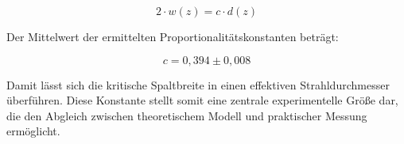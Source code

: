 \begin{equation}
    2 \cdot w(z) = c \cdot d(z)
    \label{suchung_c}
\end{equation}

Der Mittelwert der ermittelten Proportionalitätskonstanten beträgt:

\begin{equation*}
    c = 0{,}394 \pm 0{,}008
\end{equation*}

Damit lässt sich die kritische Spaltbreite in einen effektiven Strahldurchmesser überführen. 
Diese Konstante stellt somit eine zentrale experimentelle Größe dar, die den Abgleich zwischen theoretischem Modell und praktischer Messung ermöglicht.